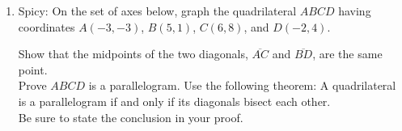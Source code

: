 \documentclass[12pt, twoside]{article}
\begin{document}
\begin{enumerate}
  \item Spicy: On the set of axes below, graph the quadrilateral $ABCD$ having coordinates $A(-3,-3)$, $B(5,1)$, $C(6,8)$, and $D(-2,4)$.
    \begin{center} %
    \end{center}
    Show that the midpoints of the two diagonals, $\overline{AC}$ and $\overline{BD}$, are the same point. \\[5cm]
    Prove $ABCD$ is a parallelogram. Use the following theorem:
    A quadrilateral is a parallelogram if and only if its diagonals bisect each other. \\[0.5cm]
    Be sure to state the conclusion in your proof.



  \end{enumerate}

  
\end{document}
